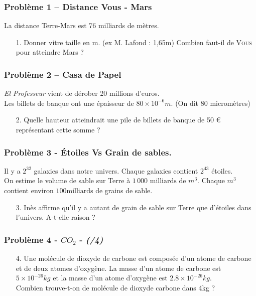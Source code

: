 \documentclass[10pt]{article}
\begin{document}
\subsubsection*{Problème 1 – Distance Vous - Mars}

La distance Terre-Mars est 76 milliards de mètres. 

\begin{itemize}
\item[1.] Donner vitre taille en m. (ex M. Lafond : 1,65m) Combien faut-il de \textsc{Vous} pour atteindre Mars ?
\end{itemize}

\subsubsection*{Problème 2 – Casa de Papel}

\textit{\og El Professeur \fg{} } vient de dérober 20 millions d’euros. \\
Les billets de banque ont une épaisseur de $80 \times 10^{-6} m$. (On dit 80 micromètres)

\begin{itemize}
\item[2.] Quelle hauteur atteindrait une pile de billets de banque de 50 \euro{} représentant cette somme ?
\end{itemize}


\subsubsection*{Problème 3 - Étoiles Vs Grain de sables.}

Il y a $2^{32}$ galaxies dans notre univers. Chaque galaxies contient $2^{43}$ étoiles.  \\
On estime le volume de sable sur Terre à $1\,000 \text{ milliards de } m^3$. Chaque $m^3$ contient environ $100 \text{milliards}$ de grains de sable. 

\begin{itemize}
\item[3.] Inès affirme qu'il y a autant de grain de sable sur Terre que d'étoiles dans l'univers. A-t-elle raison ? 
\end{itemize}


\subsubsection*{Problème 4 - $CO_2$  - \textit{(/4)}}

\begin{enumerate}
  \item[4.] Une molécule de dioxyde de carbone est composée d'un atome de carbone et de deux atomes d'oxygène. La masse d'un atome de carbone est $5 \times 10^{-26}kg$ et la masse d'un atome d'oxygène est $2.8 \times 10^{-26}kg$. \\
  Combien trouve-t-on de molécule de dioxyde carbone dans 4kg ?
\end{enumerate}
\end{document}
